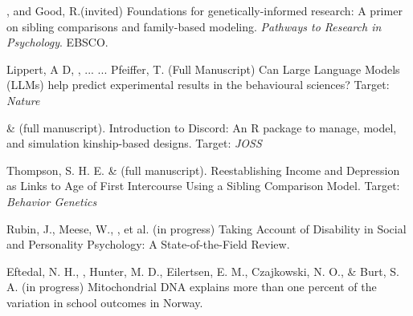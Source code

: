 

\item \meb, and Good, R.\noteA (invited) Foundations for genetically-informed research: A primer on sibling comparisons and family-based modeling. \textit{Pathways to Research in Psychology}. EBSCO.


\item Lippert, A D, , ... \meb ... Pfeiffer, T. (Full Manuscript) Can Large Language Models (LLMs) help predict experimental results in the behavioural sciences? Target:  \textit{Nature}

\item \jt \& \meb (full manuscript). Introduction to Discord: An R package to manage, model, and simulation kinship-based designs. Target: \textit{JOSS}


\item Thompson, S. H. E. \noteA \& \meb (full manuscript). Reestablishing Income and Depression as Links to Age of First Intercourse Using a Sibling Comparison Model. Target: \textit{Behavior Genetics}

\item Rubin, J., Meese, W., \meb, et al. (in progress) Taking Account of Disability in Social and Personality Psychology: A State-of-the-Field Review.

\item Eftedal, N. H., \meb, Hunter, M. D., Eilertsen, E. M., Czajkowski, N. O., \& Burt, S. A. (in progress) Mitochondrial DNA explains more than one percent of the variation in school outcomes in Norway. 




